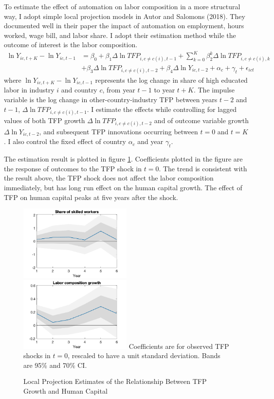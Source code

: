 \documentclass[12pt]{article}
\begin{document}
To estimate the effect of automation on labor composition in a more structural way, I adopt simple local projection models in Autor and Salomons (2018)\cite{AutorSalomons2018}. They documented well in their paper the impact of automation on employment, hours worked, wage bill, and labor share. I adopt their estimation method while the outcome of interest is the labor composition. 
\begin{align*}
\ln Y_{i c, t+K}-\ln Y_{i c, t-1}&=\beta_{0}+\beta_{1} \Delta \ln TFP_{i, c \neq c(i), t-1}+\sum_{k=0}^{K} \beta_{2}^{k} \Delta \ln TFP_{i, c \neq c(i), k} \\
&+\beta_{3} \Delta \ln T F P_{i, c \neq c(i), t-2}+\beta_{4} \Delta \ln Y_{i c, t-2}+\alpha_{c}+\gamma_{t}+\epsilon_{ict}
\end{align*}
where $\ln Y_{i c, t+K}-\ln Y_{i c, t-1}$ represents the log change in share of high educated labor in industry $i$ and country $c$, from year $t-1$ to year $t+K$. The impulse variable is the log change in other-country-industry TFP between years $t-2$ and $t-1$, $\Delta \ln TFP_{i, c \neq c(i), t-1}$. I estimate the effects while controlling for lagged values of both TFP growth $\Delta \ln TFP_{i, c \neq c(i), t-2}$ and of outcome variable growth $\Delta \ln Y_{ic, t-2}$, and subsequent TFP innovations occurring between $t=0$ and $t=K$. I also control the fixed effect of country $\alpha_{c}$ and year $\gamma_{t}$. 

The estimation result is plotted in figure \ref{LP}. Coefficients plotted in the figure are the response of outcomes to the TFP shock in $t = 0$. The trend is consistent with the result above, the TFP shock does not affect the labor composition immediately, but has long run effect on the human capital growth. The effect of TFP on human capital peaks at five years after the shock. 

\begin{figure}
\caption{Local Projection Estimates of the Relationship Between TFP Growth and Human Capital}
\label{LP}
\includegraphics[width = 0.5\textwidth]{dH_shares1_LP}
\includegraphics[width = 0.5\textwidth]{VAConLC_LP}
{\scriptsize Coefficients are for observed TFP shocks in $t = 0$, rescaled to have a unit standard deviation. Bands are 95\% and 70\% CI.}
\end{figure}
\end{document}
